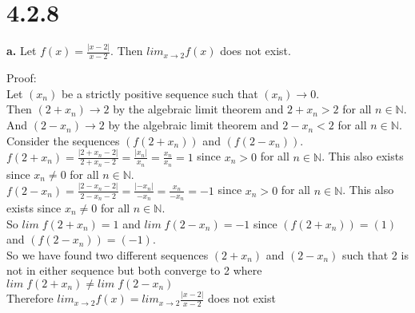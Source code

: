 \documentclass{article}
\begin{document}
\newpage
\section*{4.2.8}

{\Large \textbf{a.}} Let $f(x) =\frac{|x - 2|}{x - 2}$. Then $lim _{x\rightarrow 2} f(x)$ does not exist.
\begin{center}
    \doublespacing
    Proof:
    \\Let $(x_n)$ be a strictly positive sequence such that $(x_n)\rightarrow 0$.
    \\Then $(2 + x_n)\rightarrow 2$ by the algebraic limit theorem and $2 + x_n > 2$ for all $n\in\mathbb{N}$.
    \\And $(2 - x_n)\rightarrow 2$ by the algebraic limit theorem and $2 - x_n < 2$ for all $n\in\mathbb{N}$.
    \\Consider the sequences $(f(2 + x_n))$ and $(f(2 - x_n))$.
    \\$f(2 + x_n) =\frac{|2 + x_n - 2|}{2 + x_n - 2} =\frac{|x_n|}{x_n} =\frac{x_n}{x_n} = 1$ since $x_n > 0$ for all $n\in\mathbb{N}$. This also exists since $x_n\neq 0$ for all $n\in\mathbb{N}$.
    \\$f(2 - x_n) =\frac{|2 - x_n - 2|}{2 - x_n - 2} =\frac{|- x_n|}{- x_n} =\frac{x_n}{- x_n} = -1$ since $x_n > 0$ for all $n\in\mathbb{N}$. This also exists since $x_n\neq 0$ for all $n\in\mathbb{N}$.
    \\So $lim\; f(2 + x_n) = 1$ and $lim\; f(2 - x_n) = -1$ since $(f(2 + x_n)) = (1)$ and $(f(2 - x_n)) = (-1)$.
    \\So we have found two different sequences $(2 + x_n)$ and $(2 - x_n)$ such that 2 is not in either sequence but both converge to 2 where $lim\; f(2 + x_n)\neq lim\; f(2 - x_n)$
    \\Therefore $lim _{x\rightarrow 2} f(x) = lim _{x\rightarrow 2}\frac{|x - 2|}{x - 2}$ does not exist \qedsymbol
\end{center}
\end{document}
